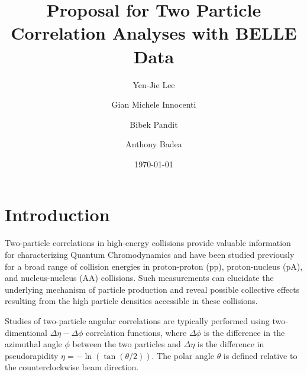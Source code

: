 \documentclass[%
preprint,
 amsmath,amssymb,
 aps,
]{revtex4-1}
\begin{document}

\title{Proposal for Two Particle Correlation Analyses with BELLE Data}%

\author{Yen-Jie Lee}
\author{Gian Michele Innocenti}%
\author{Bibek Pandit}%
\author{Anthony Badea}%


\date{\today}%

\begin{abstract}

\end{abstract}

\maketitle


\section{Introduction}

Two-particle correlations in high-energy collisions provide valuable information for characterizing Quantum Chromodynamics and have been studied previously for a broad range of collision energies in proton-proton (pp), proton-nucleus (pA), and nucleus-nucleus (AA) collisions. Such measurements can elucidate the underlying mechanism of particle production and reveal possible collective effects resulting from the high particle densities accessible in these collisions.

Studies of two-particle angular correlations are typically performed using two-dimentional $\Delta\eta-\Delta\phi$ correlation functions, where $\Delta\phi$ is the difference in the azimuthal angle $\phi$ between the two particles and $\Delta\eta$ is the difference in pseudorapidity $\eta = -\ln(\tan(\theta/2))$. The polar angle $\theta$ is defined relative to the counterclockwise beam direction.
\end{document}
